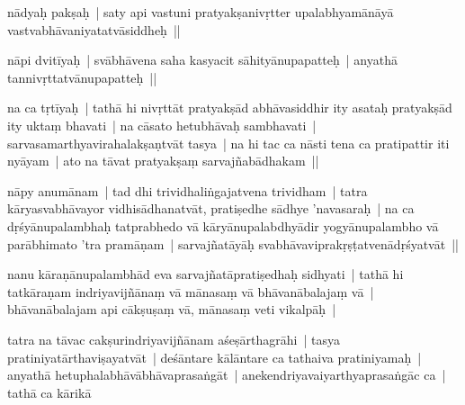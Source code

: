 \documentclass[article,12pt,a4paper]{memoir}%
\newcounter{parCount}
\begin{document}
	  
	  \pstart \leavevmode%
	\label{thakur75-7.7}nādyaḥ pakṣaḥ | saty api vastuni pratyakṣanivṛtter upalabhyamānāyā vastvabhāvaniyatatvāsiddheḥ || 
	{}
	\pend%
      

	  
	  \pstart \leavevmode%
	\label{thakur75-7.9}nāpi dvitīyaḥ | svābhāvena saha kasyacit sāhityānupapatteḥ | anyathā tannivṛttatvānupapatteḥ || 
	{}
	\pend%
      

	  
	  \pstart \leavevmode%
	\label{thakur75-7.11}na ca tṛtīyaḥ | tathā hi nivṛttāt pratyakṣād abhāvasiddhir ity asataḥ pratyakṣād ity uktaṃ bhavati | na cāsato hetubhāvaḥ sambhavati | sarvasamarthyavirahalakṣaṇtvāt tasya | na hi tac ca nāsti tena ca pratipattir iti nyāyam | ato na tāvat pratyakṣaṃ sarvajñabādhakam || 
	{}
	\pend%
      

	  
	  \pstart \leavevmode%
	\label{thakur75-7.15}nāpy anumānam | tad dhi trividhaliṅgajatvena trividham | tatra kāryasvabhāvayor vidhisādhanatvāt, pratiṣedhe sādhye 'navasaraḥ | na ca dṛśyānupalambhaḥ tatprabhedo vā kāryānupalabdhyādir yogyānupalambho vā parābhimato 'tra pramāṇam | sarvajñatāyāḥ svabhāvaviprakṛṣṭatvenādṛśyatvāt || 
	{}
	\pend%
      

	  
	  \pstart \leavevmode%
	\label{thakur75-7.19}nanu kāraṇānupalambhād eva sarvajñatāpratiṣedhaḥ sidhyati | tathā hi tatkāraṇam indriyavijñānaṃ vā mānasaṃ vā bhāvanābalajaṃ vā | bhāvanābalajam api cākṣuṣaṃ vā, mānasaṃ veti vikalpāḥ | 
	{}
	\pend%
      

	  
	  \pstart \leavevmode%
	\label{thakur75-7.22}tatra na tāvac cakṣurindriyavijñānam aśeṣārthagrāhi | tasya pratiniyatārthaviṣayatvāt | deśāntare kālāntare ca tathaiva pratiniyamaḥ | anyathā hetuphalabhāvābhāvaprasaṅgāt | anekendriyavaiyarthyaprasaṅgāc ca | tathā ca kārikā 
	{}
	\pend%
      
\end{document}
